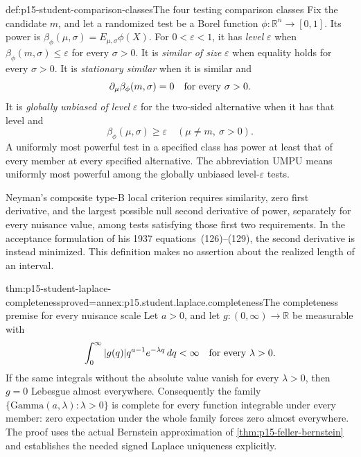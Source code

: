\begin{hbdefinition}{def:p15-student-comparison-classes}{The four testing comparison classes}
Fix the candidate \(m\), and let a randomized test be a Borel
function \(\phi:\mathbb R^n\to[0,1]\). Its power is
\(\beta_\phi(\mu,\sigma)=E_{\mu,\sigma}\phi(X)\).
For \(0<\varepsilon<1\), it has \emph{level}
\(\varepsilon\) when
\(\beta_\phi(m,\sigma)\leq\varepsilon\) for every \(\sigma>0\).
It is \emph{similar of size} \(\varepsilon\) when equality holds
for every \(\sigma>0\).
It is \emph{stationary similar} when it is similar and
\[
           \partial_\mu\beta_\phi(m,\sigma)=0
                    \quad\hbox{for every }\sigma>0.
\]
It is \emph{globally unbiased of level} \(\varepsilon\) for the
two-sided alternative when it has that level and
\[
      \beta_\phi(\mu,\sigma)\geq\varepsilon
           \quad(\mu\ne m,\ \sigma>0).
\]
A uniformly most powerful test in a specified class has power
at least that of every member at every specified alternative.
The abbreviation UMPU means uniformly most powerful among the
globally unbiased level-\(\varepsilon\) tests.

Neyman's composite type-B local criterion requires similarity,
zero first derivative, and the largest possible null second
derivative of power, separately for every nuisance value, among
tests satisfying those first two requirements. In the acceptance
formulation of his 1937 equations~(126)--(129), the second
derivative is instead minimized. This definition makes no
assertion about the realized length of an interval.
\end{hbdefinition}

\begin{hblemma}{thm:p15-student-laplace-completeness}{proved=annex:p15.student.laplace.completeness}{The completeness premise for every nuisance scale}
Let \(a>0\), and let \(g:(0,\infty)\to\mathbb R\) be
measurable with
\[
 \int_0^\infty |g(q)|q^{a-1}e^{-\lambda q}\,dq<\infty
                       \quad\hbox{for every }\lambda>0.
\]
If the same integrals without the absolute value vanish for
every \(\lambda>0\), then \(g=0\) Lebesgue almost everywhere.
Consequently the family
\(\{\mathrm{Gamma}(a,\lambda):\lambda>0\}\) is complete
for every function integrable under every member: zero
expectation under the whole family forces zero almost everywhere.
The proof uses the actual Bernstein approximation of
\cref{thm:p15-feller-bernstein} and establishes the needed signed
Laplace uniqueness explicitly.
\end{hblemma}

